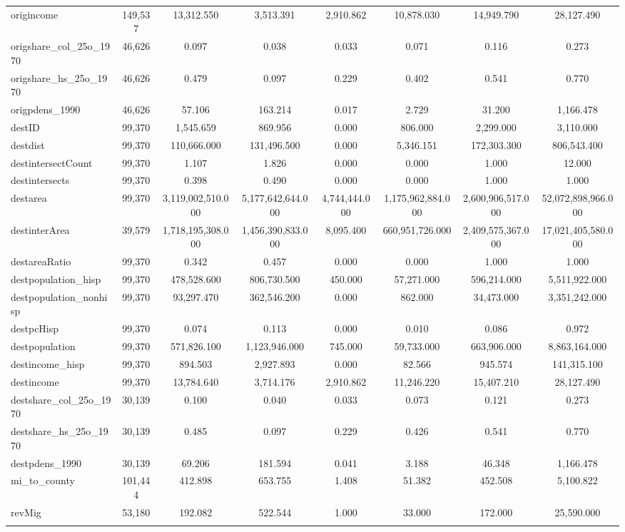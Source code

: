 \begin{table}[!htbp]
\begin{tabular}{@{\extracolsep{5pt}}lccccccc}
origincome & 149,537 & 13,312.550 & 3,513.391 & 2,910.862 & 10,878.030 & 14,949.790 & 28,127.490 \\ 
origshare\_col\_25o\_1970 & 46,626 & 0.097 & 0.038 & 0.033 & 0.071 & 0.116 & 0.273 \\ 
origshare\_hs\_25o\_1970 & 46,626 & 0.479 & 0.097 & 0.229 & 0.402 & 0.541 & 0.770 \\ 
origpdens\_1990 & 46,626 & 57.106 & 163.214 & 0.017 & 2.729 & 31.200 & 1,166.478 \\ 
destID & 99,370 & 1,545.659 & 869.956 & 0.000 & 806.000 & 2,299.000 & 3,110.000 \\ 
destdist & 99,370 & 110,666.000 & 131,496.500 & 0.000 & 5,346.151 & 172,303.300 & 806,543.400 \\ 
destintersectCount & 99,370 & 1.107 & 1.826 & 0.000 & 0.000 & 1.000 & 12.000 \\ 
destintersects & 99,370 & 0.398 & 0.490 & 0.000 & 0.000 & 1.000 & 1.000 \\ 
destarea & 99,370 & 3,119,002,510.000 & 5,177,642,644.000 & 4,744,444.000 & 1,175,962,884.000 & 2,600,906,517.000 & 52,072,898,966.000 \\ 
destinterArea & 39,579 & 1,718,195,308.000 & 1,456,390,833.000 & 8,095.400 & 660,951,726.000 & 2,409,575,367.000 & 17,021,405,580.000 \\ 
destareaRatio & 99,370 & 0.342 & 0.457 & 0.000 & 0.000 & 1.000 & 1.000 \\ 
destpopulation\_hisp & 99,370 & 478,528.600 & 806,730.500 & 450.000 & 57,271.000 & 596,214.000 & 5,511,922.000 \\ 
destpopulation\_nonhisp & 99,370 & 93,297.470 & 362,546.200 & 0.000 & 862.000 & 34,473.000 & 3,351,242.000 \\ 
destpcHisp & 99,370 & 0.074 & 0.113 & 0.000 & 0.010 & 0.086 & 0.972 \\ 
destpopulation & 99,370 & 571,826.100 & 1,123,946.000 & 745.000 & 59,733.000 & 663,906.000 & 8,863,164.000 \\ 
destincome\_hisp & 99,370 & 894.503 & 2,927.893 & 0.000 & 82.566 & 945.574 & 141,315.100 \\ 
destincome & 99,370 & 13,784.640 & 3,714.176 & 2,910.862 & 11,246.220 & 15,407.210 & 28,127.490 \\ 
destshare\_col\_25o\_1970 & 30,139 & 0.100 & 0.040 & 0.033 & 0.073 & 0.121 & 0.273 \\ 
destshare\_hs\_25o\_1970 & 30,139 & 0.485 & 0.097 & 0.229 & 0.426 & 0.541 & 0.770 \\ 
destpdens\_1990 & 30,139 & 69.206 & 181.594 & 0.041 & 3.188 & 46.348 & 1,166.478 \\ 
mi\_to\_county & 101,444 & 412.898 & 653.755 & 1.408 & 51.382 & 452.508 & 5,100.822 \\ 
revMig & 53,180 & 192.082 & 522.544 & 1.000 & 33.000 & 172.000 & 25,590.000 \\ 
\hline \\[-1.8ex] 
\end{tabular} 
\end{table} 
